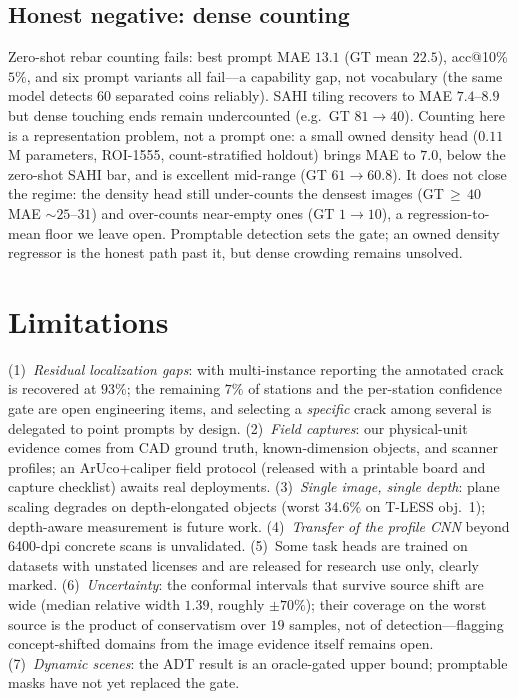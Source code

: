 \documentclass[11pt]{article}
\begin{document}
\subsection{Honest negative: dense counting}
Zero-shot rebar counting fails: best prompt MAE $13.1$ (GT mean $22.5$), acc@10\% $5\%$,
and six prompt variants all fail---a capability gap, not vocabulary (the same model
detects 60 separated coins reliably). SAHI tiling recovers to MAE $7.4$--$8.9$ but dense
touching ends remain undercounted (e.g.\ GT $81\rightarrow40$). Counting here is a
representation problem, not a prompt one: a small owned density head ($0.11$M parameters,
ROI-1555, count-stratified holdout) brings MAE to $\mathbf{7.0}$, below the zero-shot SAHI
bar, and is excellent mid-range (GT $61\rightarrow60.8$). It does not close the regime: the
density head still under-counts the densest images (GT$\,{\geq}\,40$ MAE ${\sim}25$--$31$)
and over-counts near-empty ones (GT $1\rightarrow10$), a regression-to-mean floor we leave
open. Promptable detection sets the gate; an owned density regressor is the honest path past
it, but dense crowding remains unsolved.

\section{Limitations}
(1)~\emph{Residual localization gaps}: with multi-instance reporting the annotated crack is
recovered at $93\%$; the remaining $7\%$ of stations and the per-station confidence gate are
open engineering items, and selecting a \emph{specific} crack among several is delegated to
point prompts by design. (2)~\emph{Field captures}: our physical-unit evidence
comes from CAD ground truth, known-dimension objects, and scanner profiles; an
ArUco+caliper field protocol (released with a printable board and capture checklist) awaits
real deployments. (3)~\emph{Single image, single depth}: plane scaling degrades on
depth-elongated objects (worst $34.6\%$ on T-LESS obj.~1); depth-aware measurement is
future work. (4)~\emph{Transfer of the profile CNN} beyond 6400-dpi concrete scans is
unvalidated. (5)~Some task heads are trained on datasets with unstated licenses and are
released for research use only, clearly marked. (6)~\emph{Uncertainty}: the conformal
intervals that survive source shift are wide (median relative width $1.39$, roughly
$\pm70\%$); their coverage on the worst source is the product of conservatism over $19$
samples, not of detection---flagging concept-shifted domains from the image evidence
itself remains open. (7)~\emph{Dynamic scenes}: the ADT result is an oracle-gated upper
bound; promptable masks have not yet replaced the gate.
\end{document}
